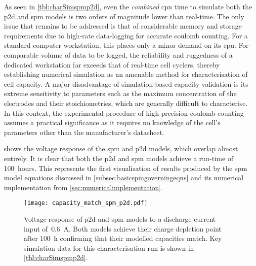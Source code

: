 

As seen in \cref{tbl:charSimspmp2d}, even  the \emph{combined} \gls{cpu} time to
simulate both  the \gls{p2d}  and \gls{spm}  models is  two orders  of magnitude
lower than  real-time. The only  issue that remains to  be addressed is  that of
considerable memory and  storage requirements due to  high-rate data-logging for
accurate coulomb counting. For a standard computer workstation, this places only
a minor demand on its \gls{cpu}. For comparable volume of data to be logged, the
reliability  and ruggedness  of  a  dedicated workstation  far  exceeds that  of
real-time cell cyclers, thereby establishing numerical simulation as an amenable
method for characterisation of cell capacity. A major disadvantage of simulation
based capacity validation  is its extreme sensitivity to parameters  such as the
maximum concentration  of the  electrodes and  their stoichiometries,  which are
generally difficult to characterise. In this context, the experimental procedure
of  high-precision  coulomb counting  assumes  a  practical significance  as  it
requires no  knowledge of  the cell's parameters  other than  the manufacturer's
datasheet.


  shows  the  voltage  response  of  the  \gls{spm}  and
\gls{p2d}  models,  which   overlap almost entirely.  It  is  clear  that   both  the  \gls{p2d}
and  \gls{spm}  models   achieve  a  run-time  of   100~hours.  This  represents
the   first  visualisation   of  results   produced  by   the  \gls{spm}   model
equations  discussed  in \cref{subsec:basicspmgoverningeqns} and  its  numerical
implementation  from \cref{sec:numericalimplementation}.

\begin{figure}[!htbp]
    \centering
    \texttt{[image: capacity\_match\_spm\_p2d.pdf]}
    \caption[Voltage response of  and  models
    for capacity validation]{Voltage response of \gls{p2d} and \gls{spm} models
        to a discharge current input of~\SI{0.6}{A}. Both models achieve their
        charge depletion point after \approx\SI{100}{\hour} confirming that
        their modelled capacities match. Key simulation data for this
    characterisation run is shown in \cref{tbl:charSimspmp2d}.}
    \label{fig:capcharspmp2d}
\end{figure}

